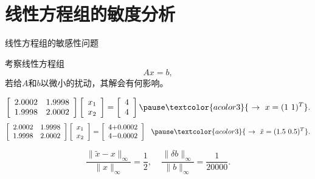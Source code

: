 \section{线性方程组的敏度分析}

\begin{frame}\ft{\secname}

\textcolor{acolor5}{线性方程组的敏感性问题}

考察线性方程组
$$
Ax=b,
$$
若给$A$和$b$以微小的扰动，其解会有何影响。

\end{frame}

\begin{frame}\ft{\secname}

\begin{li}
$$
\left[
\begin{array}{cc}
2.0002 & 1.9998\\
1.9998 & 2.0002
\end{array}
\right]
\left[
\begin{array}{c}
x_1\\
x_2
\end{array}
\right]
=
\left[
\begin{array}{c}
4\\
4
\end{array}
\right]
\pause
\textcolor{acolor3}{~\rightarrow ~x=(1~1)^T}.
$$
\pause
$$
\left[
\begin{array}{cc}
2.0002 & 1.9998\\
1.9998 & 2.0002
\end{array}
\right]
\left[
\begin{array}{c}
x_1\\
x_2
\end{array}
\right]
=
\left[
\begin{array}{c}
4{+0.0002}\\
4{-0.0002}
\end{array}
\right]~~
\pause
\textcolor{acolor3}{~\rightarrow ~\tilde{x}=(1.5~0.5)^T}.
$$
\end{li}

\pause 

$$
\frac{\|\tilde{x}-x\|_{\infty}}{\|x\|_{\infty}}=\frac12,~~~~~
\frac{\|\delta b\|_{\infty}}{\|b\|_{\infty}}=\frac1{20000}.
$$



\end{frame}


